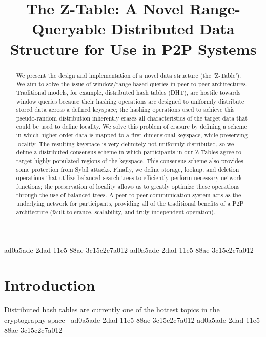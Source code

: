 \documentclass[12pt]{article}
\title{The Z-Table: A Novel Range-Queryable Distributed Data Structure for Use in P2P Systems}
\begin{document}
\maketitle

\begin{abstract}
We present the design and implementation of a novel data structure (the 'Z-Table'). We aim to solve the issue of window/range-based queries in peer to peer architectures. Traditional models, for example,  distributed hash tables (DHT), are hostile towards window queries because their hashing operations are designed to uniformly distribute stored data across a defined keyspace; the hashing operations used to achieve this pseudo-random distribution inherently erases all characteristics of the target data that could be used to define locality. We solve this problem of erasure by defining a scheme in which higher-order data is mapped to a first-dimensional keyspace, while preserving locality. The resulting keyspace is very definitely not uniformly distributed, so we define a distributed consensus scheme in which participants in our Z-Tables agree to target highly populated regions of the keyspace. This consensus scheme also provides some protection from Sybil attacks. Finally, we define storage, lookup, and deletion operations that utilize balanced search trees to efficiently perform necessary network functions; the preservation of locality allows us to greatly optimize these operations through the use of balanced trees. A peer to peer communication system acts as the underlying network for participants, providing all of the traditional benefits of a P2P architecture (fault tolerance, scalability, and truly independent operation).
\end{abstract}


ad0a5ade-2dad-11e5-88ae-3c15c2c7a012\newpage
ad0a5ade-2dad-11e5-88ae-3c15c2c7a012\section{Introduction}
Distributed hash tables are currently one of the hottest topics in the cryptography space~\cite{Stoica:2001dj,Rowstron:2001ea,Ratnasamy:2001wn}
ad0a5ade-2dad-11e5-88ae-3c15c2c7a012
\printbibliography
ad0a5ade-2dad-11e5-88ae-3c15c2c7a012
\end{document}
